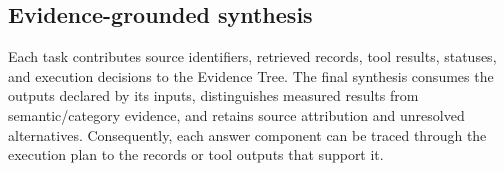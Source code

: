 \subsection{Evidence-grounded synthesis}
Each task contributes source identifiers, retrieved records, tool results, statuses, and execution decisions to the Evidence Tree. The final synthesis consumes the outputs declared by its inputs, distinguishes measured results from semantic/category evidence, and retains source attribution and unresolved alternatives. Consequently, each answer component can be traced through the execution plan to the records or tool outputs that support it.
